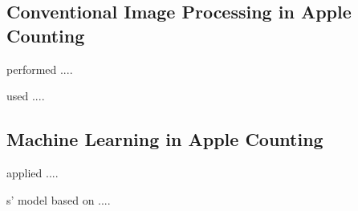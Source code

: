 \subsection{Conventional Image Processing in Apple Counting}
\cite{Qilemuge2018} performed .... 

\cite{Guennouni2014} used .... 


\subsection{Machine Learning in Apple Counting}
\cite{Rahnemoonfar2017} applied .... 

\cite{Chen2017}s' model based on ....
